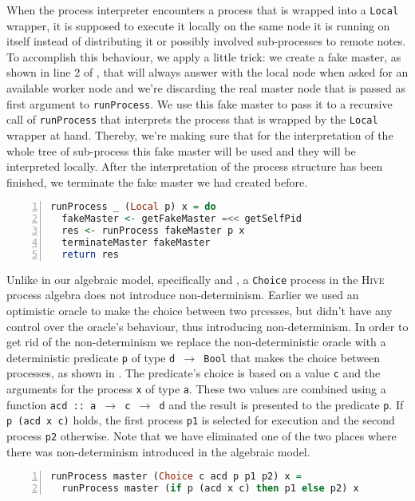 When the process interpreter encounters a process that is wrapped into a \texttt{Local} wrapper, it is supposed to execute it locally on the same node it is running on itself instead of distributing it or possibly involved sub-processes to remote notes. To accomplish this behaviour, we apply a little trick: we create a fake master, as shown in line 2 of , that will always answer with the local node when asked for an available worker node and we're discarding the real master node that is passed as first argument to \texttt{runProcess}. We use this fake master to pass it to a recursive call of \texttt{runProcess} that interprets the process that is wrapped by the \texttt{Local} wrapper at hand. Thereby, we're making sure that for the interpretation of the whole tree of sub-process this fake master will be used and they will be interpreted locally. After the interpretation of the process structure has been finished, we terminate the fake master we had created before.
\begin{lstlisting}[language=Haskell,caption=Implementation of the interpreter for \texttt{Local} processes.,label=lst:runprocess_local,numbers=left,frame=bt]
runProcess _ (Local p) x = do
  fakeMaster <- getFakeMaster =<< getSelfPid
  res <- runProcess fakeMaster p x
  terminateMaster fakeMaster
  return res
\end{lstlisting}

Unlike in our algebraic model, specifically  and , a \texttt{Choice} process in the \textsc{Hive} process algebra does not introduce non-determinism. Earlier we used an optimistic oracle to make the choice between two prcesses, but didn't have any control over the oracle's behaviour, thus introducing non-determinism. In order to get rid of the non-determinism we replace the non-deterministic oracle with a deterministic predicate \texttt{p} of type \texttt{d $\to$ Bool} that makes the choice between processes, as shown in . The predicate's choice is based on a value \texttt{c} and the arguments for the process \texttt{x} of type \texttt{a}. These two values are combined using a function \texttt{acd :: a $\to$ c $\to$ d} and the result is presented to the predicate \texttt{p}. If \texttt{p (acd x c)} holds, the first process \texttt{p1} is selected for execution and the second process \texttt{p2} otherwise. Note that we have eliminated one of the two places where there was non-determinism introduced in the algebraic model.  %
\begin{lstlisting}[language=Haskell,caption=Implementation of the interpreter for \texttt{Choice} processes.,label=lst:runprocess_choice,numbers=left,frame=bt]
runProcess master (Choice c acd p p1 p2) x =
  runProcess master (if p (acd x c) then p1 else p2) x
\end{lstlisting}

